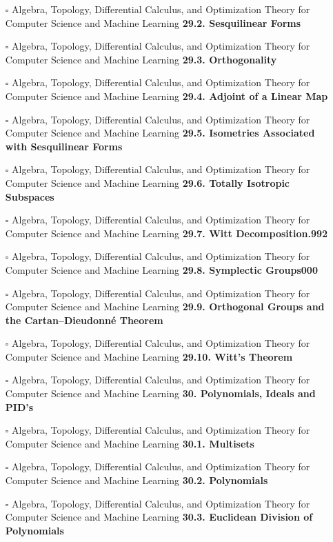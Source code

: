 \documentclass[a4, landscape, 12pt]{article}
\newcommand{\checkbox}{$\square$}%
\begin{document}
\begin{itemize}
{}
\item [\checkbox]  Algebra, Topology, Differential Calculus, and Optimization Theory for Computer Science and Machine Learning \textbf{ 29.2. Sesquilinear Forms
}
\item [\checkbox]  Algebra, Topology, Differential Calculus, and Optimization Theory for Computer Science and Machine Learning \textbf{ 29.3. Orthogonality
}
\item [\checkbox]  Algebra, Topology, Differential Calculus, and Optimization Theory for Computer Science and Machine Learning \textbf{ 29.4. Adjoint of a Linear Map
}
\item [\checkbox]  Algebra, Topology, Differential Calculus, and Optimization Theory for Computer Science and Machine Learning \textbf{ 29.5. Isometries Associated with Sesquilinear Forms
}
\item [\checkbox]  Algebra, Topology, Differential Calculus, and Optimization Theory for Computer Science and Machine Learning \textbf{ 29.6. Totally Isotropic Subspaces
}
\item [\checkbox]  Algebra, Topology, Differential Calculus, and Optimization Theory for Computer Science and Machine Learning \textbf{ 29.7. Witt Decomposition.992
}
\item [\checkbox]  Algebra, Topology, Differential Calculus, and Optimization Theory for Computer Science and Machine Learning \textbf{ 29.8. Symplectic Groups000
}
\item [\checkbox]  Algebra, Topology, Differential Calculus, and Optimization Theory for Computer Science and Machine Learning \textbf{ 29.9. Orthogonal Groups and the Cartan–Dieudonné Theorem
}
\item [\checkbox]  Algebra, Topology, Differential Calculus, and Optimization Theory for Computer Science and Machine Learning \textbf{ 29.10. Witt’s Theorem
}
\item [\checkbox]  Algebra, Topology, Differential Calculus, and Optimization Theory for Computer Science and Machine Learning \textbf{ 30. Polynomials, Ideals and PID’s
}
\item [\checkbox]  Algebra, Topology, Differential Calculus, and Optimization Theory for Computer Science and Machine Learning \textbf{ 30.1. Multisets
}
\item [\checkbox]  Algebra, Topology, Differential Calculus, and Optimization Theory for Computer Science and Machine Learning \textbf{ 30.2. Polynomials
}
\item [\checkbox]  Algebra, Topology, Differential Calculus, and Optimization Theory for Computer Science and Machine Learning \textbf{ 30.3. Euclidean Division of Polynomials
}
\end{itemize}
\end{document}
